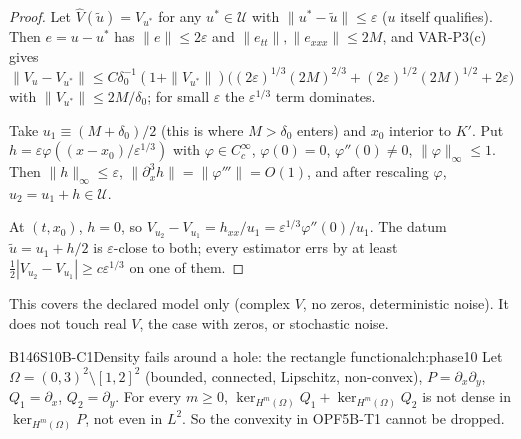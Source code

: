 \begin{proof}
Let $\hat V(\tilde u)=V_{u^*}$ for any $u^*\in\mathcal U$ with $\|u^*-\tilde u\|\le\varepsilon$ ($u$ itself qualifies). Then $e=u-u^*$ has $\|e\|\le2\varepsilon$ and $\|e_{tt}\|,\|e_{xxx}\|\le2M$, and VAR-P3(c) gives $\|V_u-V_{u^*}\|\le C\delta_0^{-1}(1+\|V_{u^*}\|)\bigl((2\varepsilon)^{1/3}(2M)^{2/3}+(2\varepsilon)^{1/2}(2M)^{1/2}+2\varepsilon\bigr)$ with $\|V_{u^*}\|\le2M/\delta_0$; for small $\varepsilon$ the $\varepsilon^{1/3}$ term dominates.

Take $u_1\equiv(M+\delta_0)/2$ (this is where $M>\delta_0$ enters) and $x_0$ interior to $K'$. Put $h=\varepsilon\varphi((x-x_0)/\varepsilon^{1/3})$ with $\varphi\in C_c^\infty$, $\varphi(0)=0$, $\varphi''(0)\ne0$, $\|\varphi\|_\infty\le1$. Then $\|h\|_\infty\le\varepsilon$, $\|\partial_x^3h\|=\|\varphi'''\|=O(1)$, and after rescaling $\varphi$, $u_2=u_1+h\in\mathcal U$.

At $(t,x_0)$, $h=0$, so $V_{u_2}-V_{u_1}=h_{xx}/u_1=\varepsilon^{1/3}\varphi''(0)/u_1$. The datum $\tilde u=u_1+h/2$ is $\varepsilon$-close to both; every estimator errs by at least $\frac12|V_{u_2}-V_{u_1}|\ge c\varepsilon^{1/3}$ on one of them.

\end{proof}

\begin{caution}[title=Scope]
This covers the declared model only (complex $V$, no zeros, deterministic noise). It does not touch real $V$, the case with zeros, or stochastic noise.
\end{caution}

\begin{dimcard}{B146}{S10B-C1}{Density fails around a hole: the rectangle functional}{\pw}{ch:phase10}
Let $\Omega=(0,3)^2\setminus[1,2]^2$ (bounded, connected, Lipschitz, non-convex), $P=\partial_x\partial_y$, $Q_1=\partial_x$, $Q_2=\partial_y$. For every $m\ge0$, $\ker_{H^m(\Omega)}Q_1+\ker_{H^m(\Omega)}Q_2$ is not dense in $\ker_{H^m(\Omega)}P$, not even in $L^2$. So the convexity in OPF5B-T1 cannot be dropped.
\end{dimcard}

